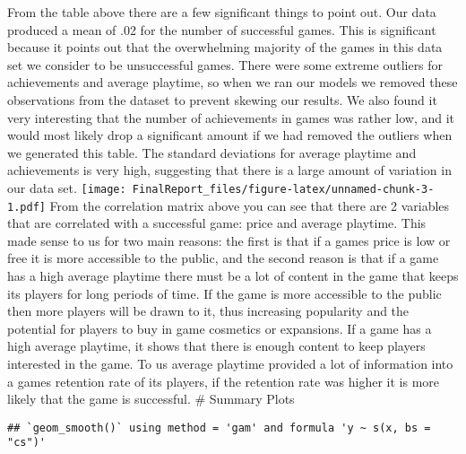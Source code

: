 \documentclass[]{article}
\begin{document}
From the table above there are a few significant things to point out.
Our data produced a mean of .02 for the number of successful games. This
is significant because it points out that the overwhelming majority of
the games in this data set we consider to be unsuccessful games. There
were some extreme outliers for achievements and average playtime, so
when we ran our models we removed these observations from the dataset to
prevent skewing our results. We also found it very interesting that the
number of achievements in games was rather low, and it would most likely
drop a significant amount if we had removed the outliers when we
generated this table. The standard deviations for average playtime and
achievements is very high, suggesting that there is a large amount of
variation in our data set.
\texttt{[image: FinalReport\_files/figure-latex/unnamed-chunk-3-1.pdf]}
From the correlation matrix above you can see that there are 2 variables
that are correlated with a successful game: price and average playtime.
This made sense to us for two main reasons: the first is that if a games
price is low or free it is more accessible to the public, and the second
reason is that if a game has a high average playtime there must be a lot
of content in the game that keeps its players for long periods of time.
If the game is more accessible to the public then more players will be
drawn to it, thus increasing popularity and the potential for players to
buy in game cosmetics or expansions. If a game has a high average
playtime, it shows that there is enough content to keep players
interested in the game. To us average playtime provided a lot of
information into a games retention rate of its players, if the retention
rate was higher it is more likely that the game is successful. \#
Summary Plots

\begin{verbatim}
## `geom_smooth()` using method = 'gam' and formula 'y ~ s(x, bs = "cs")'
\end{verbatim}
\end{document}
